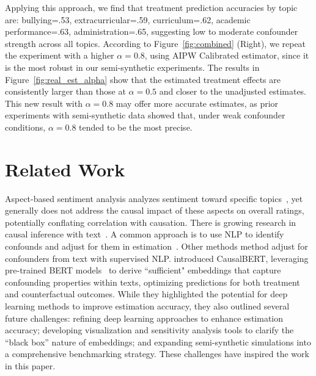\documentclass[11pt]{article}
\begin{document}
Applying this approach, we find that treatment prediction accuracies by topic are: bullying=.53, extracurricular=.59, curriculum=.62, academic performance=.63, administration=.65, suggesting low to moderate confounder strength across all topics. According to Figure~\ref{fig:combined} (Right), we repeat the experiment with a higher \(\alpha=0.8\), using AIPW Calibrated estimator, since it is the most robust in our semi-synthetic experiments. The results in Figure~\ref{fig:real_est_alpha} show that the estimated treatment effects are consistently larger than those at \(\alpha=0.5\) and closer to the unadjusted estimates. This new result with \(\alpha=0.8\) may offer more accurate estimates, as prior experiments with semi-synthetic data showed that, under weak confounder conditions,  $\alpha=0.8$ tended to be the most precise. 







\section{Related Work}
\label{sec:related_work}

\vspace{-.1cm}

Aspect-based sentiment analysis analyzes sentiment toward specific topics~\cite{hu2004mining,tang-etal-2015-document,ruder-etal-2016-hierarchical},
yet generally does not address the causal impact of these aspects on overall ratings, potentially conflating correlation with causation. 
There is growing research in causal inference with text~\cite{keith2020text,feder2021causalm,keith2023rct,veljanovski2024doublelingo}. 
A common approach is to use NLP to identify confounds and adjust for them in estimation~\cite{sridhar2019estimating,roberts2020adjusting,mozer2020matching}. Other methods method adjust for confounders from text with supervised NLP. \citet{veitch2020adapting} introduced CausalBERT, leveraging pre-trained BERT models~\cite{devlin2018bert} to derive ``sufficient" embeddings that capture confounding properties within texts, optimizing predictions for both treatment and counterfactual outcomes. While they highlighted the potential for deep learning methods to improve estimation accuracy, they also outlined several future challenges: refining deep learning approaches to enhance estimation accuracy; developing visualization and sensitivity analysis tools to clarify the ``black box'' nature of embeddings; and expanding semi-synthetic simulations into a comprehensive benchmarking strategy. These challenges have inspired the work in this paper.
\end{document}
